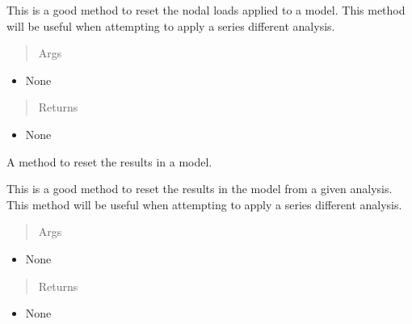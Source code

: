 \documentclass[letterpaper,10pt,english]{sphinxmanual}
\begin{document}
\begin{fulllineitems}
\begin{fulllineitems}
This is a good method to reset the nodal loads applied to a model. This
method will be useful when attempting to apply a series different
analysis.
\begin{quote}\begin{description}
\item[{Args}] \leavevmode
\end{description}\end{quote}
\begin{itemize}
\item {} 
None

\end{itemize}
\begin{quote}\begin{description}
\item[{Returns}] \leavevmode
\end{description}\end{quote}
\begin{itemize}
\item {} 
None

\end{itemize}

\end{fulllineitems}


\begin{fulllineitems}
\label{FEM:AeroComBAT.FEM.Model.resetResults}
A method to reset the results in a model.

This is a good method to reset the results in the model from a given
analysis. This method will be useful when attempting to apply a series
different analysis.
\begin{quote}\begin{description}
\item[{Args}] \leavevmode
\end{description}\end{quote}
\begin{itemize}
\item {} 
None

\end{itemize}
\begin{quote}\begin{description}
\item[{Returns}] \leavevmode
\end{description}\end{quote}
\begin{itemize}
\item {} 
None


\end{itemize}
\end{fulllineitems}
\end{fulllineitems}
\end{document}
